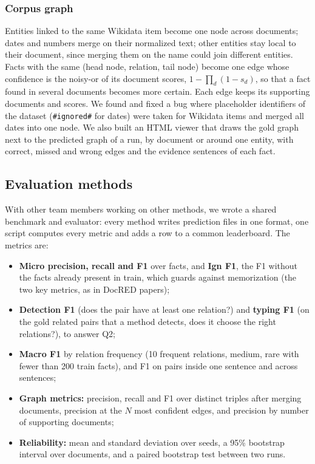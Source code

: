 \documentclass[pdflatex,sn-mathphys-num]{sn-jnl}
\begin{document}
\subsubsection{Corpus graph}\label{sec:graph}

Entities linked to the same Wikidata item become one node across documents; dates and numbers merge on their normalized text; other entities stay local to their document, since merging them on the name could join different entities. Facts with the same (head node, relation, tail node) become one edge whose confidence is the noisy-or of its document scores, $1-\prod_d (1-s_d)$, so that a fact found in several documents becomes more certain. Each edge keeps its supporting documents and scores. We found and fixed a bug where placeholder identifiers of the dataset (\texttt{\#ignored\#} for dates) were taken for Wikidata items and merged all dates into one node. We also built an HTML viewer that draws the gold graph next to the predicted graph of a run, by document or around one entity, with correct, missed and wrong edges and the evidence sentences of each fact.

\subsection{Evaluation methods}\label{sec:evaluation}

With other team members working on other methods, we wrote a shared benchmark and evaluator: every method writes prediction files in one format, one script computes every metric and adds a row to a common leaderboard. The metrics are:

\begin{itemize}
\item \textbf{Micro precision, recall and F1} over facts, and \textbf{Ign F1}, the F1 without the facts already present in train, which guards against memorization (the two key metrics, as in DocRED papers);
\item \textbf{Detection F1} (does the pair have at least one relation?) and \textbf{typing F1} (on the gold related pairs that a method detects, does it choose the right relations?), to answer Q2;
\item \textbf{Macro F1} by relation frequency (10 frequent relations, medium, rare with fewer than 200 train facts), and F1 on pairs inside one sentence and across sentences;
\item \textbf{Graph metrics:} precision, recall and F1 over distinct triples after merging documents, precision at the $N$ most confident edges, and precision by number of supporting documents;
\item \textbf{Reliability:} mean and standard deviation over seeds, a 95\% bootstrap interval over documents, and a paired bootstrap test between two runs.
\end{itemize}
\end{document}
